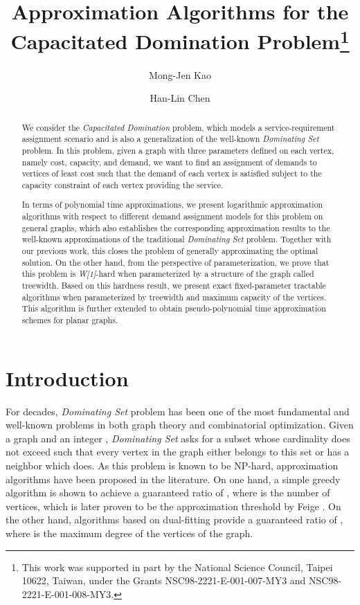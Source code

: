 \documentclass[a4paper,11pt]{article}
\title{\bf Approximation Algorithms for the Capacitated Domination Problem\thanks{
This work was supported in part by the National Science Council, Taipei 10622, Taiwan, under
the Grants NSC98-2221-E-001-007-MY3 and NSC98-2221-E-001-008-MY3.}}
\author[ ]{Mong-Jen Kao}
\author[ ]{Han-Lin Chen}
\affil[ ]{Department of Computer Science and Information Engineering, \newline
National Taiwan University, Taiwan.}
\affil[ ]{\newline Emails: d97021@csie.ntu.edu.tw, kalent37@ms89.url.com.tw}
\date{\empty}
\theoremstyle{definition}
\begin{document}
\maketitle



\begin{abstract}
We consider the {\em Capacitated Domination} problem, which models a
service-requirement assignment scenario and is also a
generalization of the well-known {\em Dominating Set} problem. In
this problem, given a graph with three parameters defined on each vertex, namely cost,
capacity, and demand, we want to find
an assignment of demands to vertices of least cost such that the demand of each vertex is
satisfied subject to the capacity constraint of each vertex providing the service.

In terms of polynomial time approximations, we present logarithmic approximation algorithms with respect to different demand assignment models for this problem on general
graphs, which also establishes the corresponding approximation
results to the well-known approximations of the
traditional {\em Dominating Set} problem. Together with our
previous work, this closes the problem of generally approximating
the optimal solution. On the other hand, from the perspective of
parameterization, we prove that this problem is {\it W[1]}-hard when parameterized by a structure of the graph called treewidth. Based on this hardness result, we present exact fixed-parameter tractable algorithms when parameterized by treewidth and maximum capacity of the vertices.
This algorithm is further extended to obtain pseudo-polynomial time approximation schemes for planar graphs.
\end{abstract}



\section{Introduction}

For decades, {\em Dominating Set} problem has been one of the most
fundamental and well-known problems in both 
graph theory and combinatorial optimization. Given a graph  and an integer ,
{\em Dominating Set} asks for a subset  whose cardinality
does not exceed  such that every vertex in the graph either
belongs to this set or has a neighbor which does. As this problem is
known to be NP-hard, approximation algorithms have been proposed in
the literature. On one hand, a simple greedy algorithm is shown to
achieve a guaranteed ratio of  \cite{VC79,804034,LL75}, where  is the
number of vertices, which is later proven to be the approximation
threshold by Feige \cite{285059}. On the other hand, algorithms
based on dual-fitting provide a guaranteed ratio of 
\cite{DSH82}, where  is the maximum degree of the vertices of the graph.
\end{document}
